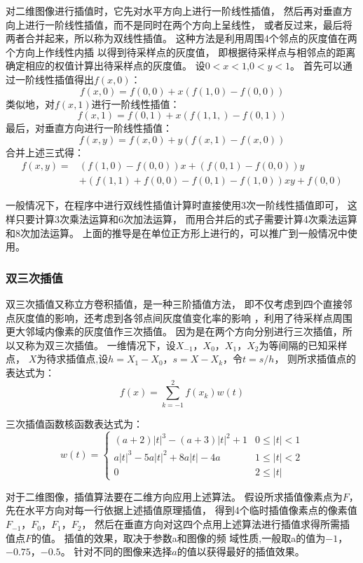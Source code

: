 对二维图像进行插值时，它先对水平方向上进行一阶线性插值，
然后再对垂直方向上进行一阶线性插值，而不是同时在两个方向上呈线性，
或者反过来，最后将两者合并起来，所以称为双线性插值。
这种方法是利用周围4个邻点的灰度值在两个方向上作线性内插
以得到待采样点的灰度值，
即根据待采样点与相邻点的距离确定相应的权值计算出待采样点的灰度值。
设$0<x<1$,$0<y<1$。
首先可以通过一阶线性插值得出$f(x,0)$：
\begin{equation}
  f(x,0)=f(0,0)+x(f(1,0)-f(0,0))
\end{equation}
类似地，对$f(x,1)$进行一阶线性插值：
\begin{equation}
  f(x,1)=f(0,1)+x(f(1,1,)-f(0,1))
\end{equation}
最后，对垂直方向进行一阶线性插值：
\begin{equation}
  f(x,y)=f(x,0)+y(f(x,1)-f(x,0))
\end{equation}
合并上述三式得：
\begin{equation}
  \begin{split}
    f(x,y)=&(f(1,0)-f(0,0))x+(f(0,1)-f(0,0))y\\
    &+(f(1,1)+f(0,0)-f(0,1)-f(1,0))xy+f(0,0)
  \end{split}
\end{equation}

一般情况下，在程序中进行双线性插值计算时直接使用3次一阶线性插值即可，
这样只要计算3次乘法运算和6次加法运算，
而用合并后的式子需要计算4次乘法运算和8次加法运算。
上面的推导是在单位正方形上进行的，可以推广到一般情况中使用。

\subsubsection{双三次插值}
双三次插值又称立方卷积插值，是一种三阶插值方法，
即不仅考虑到四个直接邻点灰度值的影响，还考虑到各邻点间灰度值变化率的影响
，利用了待采样点周围更大邻域内像素的灰度值作三次插值。
因为是在两个方向分别进行三次插值，所以又称为双三次插值。
一维情况下，设$X_{-1}$，$X_0$，$X_1$，$X_2$为等间隔的已知采样点，
$X$为待求插值点,设$h=X_1-X_0$，$s=X-X_k$，令$t=s/h$，
则所求插值点的表达式为：
\begin{equation}
  f(x)=\sum_{k=-1}^2f(x_k)w(t)
\end{equation}

三次插值函数核函数表达式为：
\begin{equation}
  w(t)=
  \begin{cases}
    (a+2)\lvert t\rvert^3-(a+3)\lvert t\rvert^2+1& 0\le\lvert t\rvert<1\\
    a\lvert t\rvert^3-5a\lvert t\rvert^2+8a\lvert t\rvert-4a
    &1\le\lvert t\rvert<2\\
    0& 2\le\lvert t\rvert
  \end{cases}
\end{equation}

对于二维图像，插值算法要在二维方向应用上述算法。
假设所求插值像素点为$F$，先在水平方向对每一行依据上述插值原理插值，
得到4个临时插值像素点的像素值$F_{-1}$，$F_0$，$F_1$，$F_2$，
然后在垂直方向对这四个点用上述算法进行插值求得所需插值点$F$的值。
插值的效果，取决于参数a和图像的频
域性质,一般取a的值为$-1$，$-0.75$，$-0.5$。
针对不同的图像来选择$a$的值以获得最好的插值效果。

